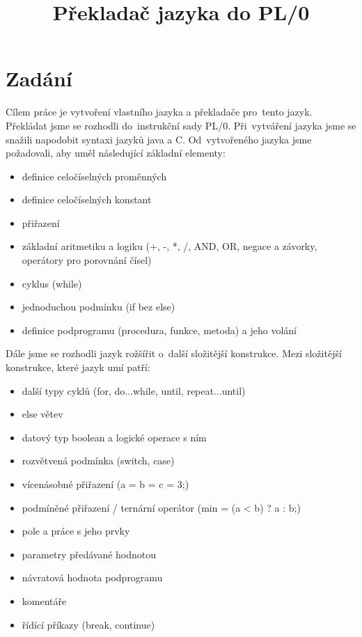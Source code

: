 \documentclass[czech]{thesiskiv}
\title{Překladač jazyka do PL/0}
\begin{document}
%
\maketitle
\thispagestyle{empty} 
\pagestyle{empty}
\tableofcontents
{}

\chapter{Zadání}
\label{sec:zadani}
\pagestyle{plain}
\setcounter{page}{1}
Cílem práce je vytvoření vlastního jazyka a překladače pro~tento jazyk.
Překládat jsme se rozhodli do~instrukční sady PL/0.
Při~vytváření jazyka jsme se snažili napodobit syntaxi jazyků java a C.
Od~vytvořeného jazyka jsme požadovali, aby uměl následující základní elementy:

\begin{itemize}
\item definice celočíselných proměnných
\item definice celočíselných konstant
\item přiřazení
\item základní aritmetiku a logiku (+, -, *, /, AND, OR, negace a závorky, operátory pro porovnání čísel)
\item cyklus (while)
\item jednoduchou podmínku (if bez else)
\item definice podprogramu (procedura, funkce, metoda) a jeho volání
\end{itemize}

\noindent Dále jsme se rozhodli jazyk rožšířit o~další složitější konstrukce.
Mezi složitější konstrukce, které jazyk umí patří:

\begin{itemize}
\item další typy cyklů (for, do...while, until, repeat...until)
\item else větev
\item datový typ boolean a logické operace s ním
\item rozvětvená podmínka (switch, case)
\item vícenásobné přiřazení (a = b = c = 3;)
\item podmíněné přiřazení / ternární operátor (min = (a < b) ? a : b;)
\item pole a práce s jeho prvky
\item parametry předávané hodnotou
\item návratová hodnota podprogramu
\item komentáře
\item řídící příkazy (break, continue)
\end{itemize}
\end{document}
